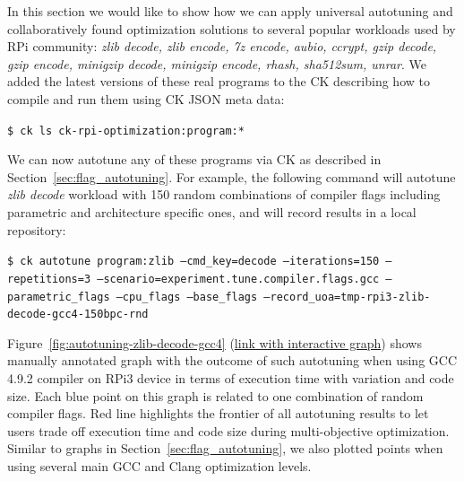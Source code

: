 In this section we would like to show how we can apply universal autotuning 
and collaboratively found optimization solutions to several popular workloads
used by RPi community: \textit{zlib decode, zlib encode, 
7z encode, aubio, ccrypt, gzip decode, gzip encode, minigzip decode, 
minigzip encode, rhash, sha512sum, unrar}.
%
We added the latest versions of these real programs 
to the CK describing how to compile and run them 
using CK JSON meta data:

\begin{flushleft}
\texttt{\$ ck ls ck-rpi-optimization:program:*}
\end{flushleft}

We can now autotune any of these programs via CK as described in Section~\ref{sec:flag_autotuning}.
%
For example, the following command will autotune \textit{zlib decode} workload
with 150 random combinations of compiler flags including parametric and architecture 
specific ones, and will record results in a local repository:

\begin{flushleft}
\texttt{\$ ck autotune program:zlib --cmd\_key=decode
  --iterations=150 --repetitions=3 
  --scenario=experiment.tune.compiler.flags.gcc
  --parametric\_flags --cpu\_flags --base\_flags 
  --record\_uoa=tmp-rpi3-zlib-decode-gcc4-150bpc-rnd}
\end{flushleft}

Figure~\ref{fig:autotuning-zlib-decode-gcc4} 
(\href{http://cknowledge.org/repo/web.php?wcid=graph:3a97d1f6494f9d45&subgraph=rpi3-autotuning-zlib-decode-gcc4-interactive}{link with interactive graph}) 
shows manually annotated graph with the outcome of such autotuning 
when using GCC 4.9.2 compiler on RPi3 device
in terms of execution time with variation and code size.
%
Each blue point on this graph is related to one combination of random compiler flags.
%
Red line highlights the frontier of all autotuning results 
to let users trade off execution time and code size 
during multi-objective optimization.
%
Similar to graphs in Section~\ref{sec:flag_autotuning}, we also plotted points 
when using several main GCC and Clang optimization levels.

